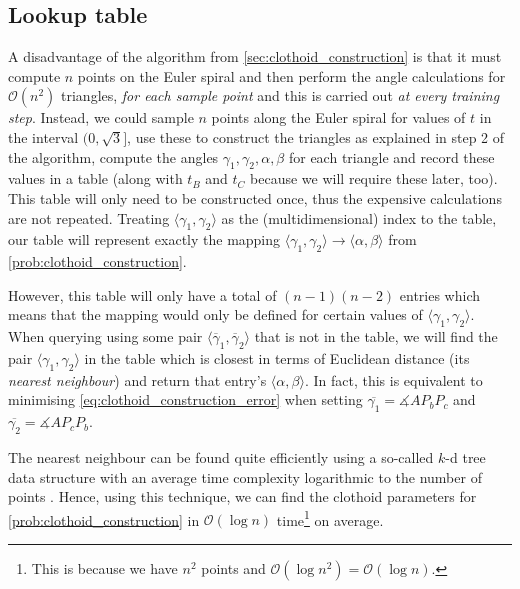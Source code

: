 \subsection{Lookup table}
\label{sec:clothoid_lookup}
A disadvantage of the algorithm from \ref{sec:clothoid_construction} is that it must compute $n$ points on the Euler spiral and then perform the angle calculations for $\mathcal{O}(n^2)$ triangles, \textit{for each sample point} and this is carried out \textit{at every training step}.
Instead, we could sample $n$ points along the Euler spiral for values of $t$ in the interval $(0, \sqrt{3}]$, use these to construct the triangles as explained in step 2 of the algorithm, compute the angles $\gamma_1,\gamma_2,\alpha,\beta$ for each triangle and record these values in a table (along with $t_B$ and $t_C$ because we will require these later, too).
This table will only need to be constructed once, thus the expensive calculations are not repeated.
Treating $\langle\gamma_1,\gamma_2\rangle$ as the (multidimensional) index to the table, our table will represent exactly the mapping $\langle\gamma_1,\gamma_2\rangle\rightarrow\langle\alpha,\beta\rangle$ from \ref{prob:clothoid_construction}.

However, this table will only have a total of $(n-1)(n-2)$ entries which means that the mapping would only be defined for certain values of $\langle\gamma_1,\gamma_2\rangle$.
When querying using some pair $\langle\overline{\gamma}_1,\overline{\gamma}_2\rangle$ that is not in the table, we will find the pair $\langle\gamma_1,\gamma_2\rangle$ in the table which is closest in terms of Euclidean distance (its \textit{nearest neighbour}) and return that entry's $\langle \alpha,\beta\rangle$.
In fact, this is equivalent to minimising \ref{eq:clothoid_construction_error} when setting $\overline{\gamma_1} = \measuredangle{AP_bP_c}$ and $\overline{\gamma_2} = \measuredangle{AP_cP_b}$.

The nearest neighbour can be found quite efficiently using a so-called $k$-d tree data structure with an average time complexity logarithmic to the number of points \cite{friedman1977}.
Hence, using this technique, we can find the clothoid parameters for \ref{prob:clothoid_construction} in $\mathcal{O}(\log n)$ time\footnote{This is because we have $n^2$ points and $\mathcal{O}(\log{n^2})=\mathcal{O}(\log n)$.} on average.

